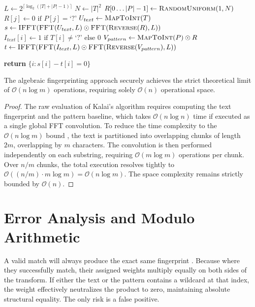 \begin{algorithm}[H]
\caption{Kalai Algebraic Fingerprinting}
\begin{algorithmic}[1]
    \State $L \gets 2^{\lceil \log_2(|T| + |P| - 1) \rceil}$
    \State $N \gets |T|^2$ 
    \State $R[0 \dots |P|-1] \gets \text{\textsc{RandomUniform}}(1, N)$ 
    \State $R[j] \gets 0 \text{ if } P[j] = \text{`?'}$
    \State $U_{text} \gets \text{\textsc{MapToInt}}(T)$ 
    \State $s \gets \text{\textsc{IFFT}}(\text{\textsc{FFT}}(U_{text}, L) \odot \text{\textsc{FFT}}(\text{\textsc{Reverse}}(R), L))$
    \State $I_{text}[i] \gets 1 \text{ if } T[i] \neq \text{`?'} \text{ else } 0$
    \State $V_{pattern} \gets \text{\textsc{MapToInt}}(P) \odot R$
    \State $t \gets \text{\textsc{IFFT}}(\text{\textsc{FFT}}(I_{text}, L) \odot \text{\textsc{FFT}}(\text{\textsc{Reverse}}(V_{pattern}), L))$ 
    
    \State \textbf{return} $\{i \colon s[i] - t[i] = 0\}$
\EndFunction
\end{algorithmic}
\end{algorithm}

\begin{theorem}
The algebraic fingerprinting approach securely achieves the strict theoretical limit of $\mathcal{O}(n \log m)$ operations, requiring solely $\mathcal{O}(n)$ operational space.
\end{theorem}

\begin{proof}
The raw evaluation of Kalai's algorithm requires computing the text fingerprint and the pattern baseline, which takes $\mathcal{O}(n \log n)$ time if executed as a single global FFT convolution. To reduce the time complexity to the $\mathcal{O}(n \log m)$ bound \cite{kalai2002}, the text is partitioned into overlapping chunks of length $2m$, overlapping by $m$ characters. The convolution is then performed independently on each substring, requiring $\mathcal{O}(m \log m)$ operations per chunk. Over $n/m$ chunks, the total execution resolves tightly to $\mathcal{O}((n/m) \cdot m \log m) = \mathcal{O}(n \log m)$. The space complexity remains strictly bounded by $\mathcal{O}(n)$.
\end{proof}

\section{Error Analysis and Modulo Arithmetic}
A valid match will always produce the exact same fingerprint \cite{kalai2002}. Because where they successfully match, their assigned weights multiply equally on both sides of the transform. If either the text or the pattern contains a wildcard at that index, the weight effectively neutralizes the product to zero, maintaining absolute structural equality. The only risk is a false positive. 

